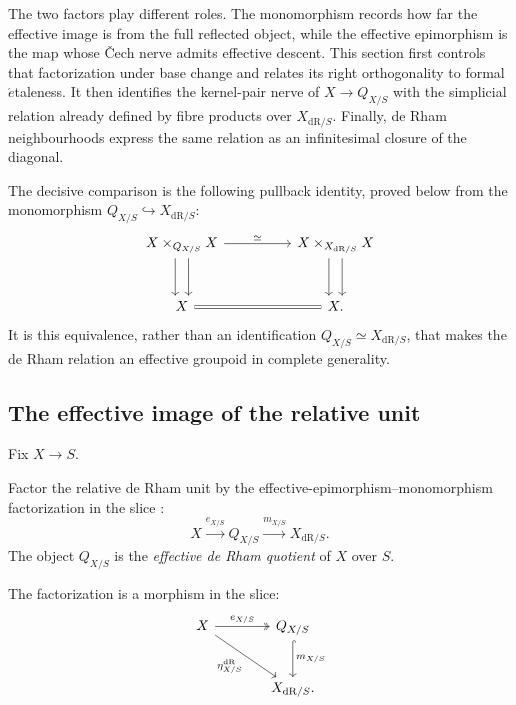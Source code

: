 The two factors play different roles. The monomorphism records how far the
effective image is from the full reflected object, while the effective
epimorphism is the map whose \v{C}ech nerve admits effective descent. This
section first controls that factorization under base change and relates its
right orthogonality to formal \(\acute{e}\)taleness. It then identifies the
kernel-pair nerve of \(X\to Q_{X/S}\) with the simplicial relation already
defined by fibre products over \(X_{\mathrm{dR}/S}\). Finally, de Rham
neighbourhoods express the same relation as an infinitesimal closure of the
diagonal.

The decisive comparison is the following pullback identity, proved below from
the monomorphism \(Q_{X/S}\hookrightarrow X_{\mathrm{dR}/S}\):
\[
\begin{tikzcd}[column sep=huge,row sep=large]
  X\times_{Q_{X/S}}X
      \arrow[r,"\simeq"]
      \arrow[d,shift left=1.1ex]
      \arrow[d,shift right=1.1ex]
  &
  X\times_{X_{\mathrm{dR}/S}}X
      \arrow[d,shift left=1.1ex]
      \arrow[d,shift right=1.1ex]
  \\
  X \arrow[r,equal] & X .
\end{tikzcd}
\]
It is this equivalence, rather than an identification
\(Q_{X/S}\simeq X_{\mathrm{dR}/S}\), that makes the de Rham relation an
effective groupoid in complete generality.
\subsection{The effective image of the relative unit}
\label{sec:effective-de-Rham-quotient}

Fix \(X\to S\).

\begin{definition}
Factor the relative de Rham unit by the effective-epimorphism--monomorphism
factorization in the slice \cite{LurieHigherToposTheory}:
\[
  X\xrightarrow{e_{X/S}}Q_{X/S}
   \xrightarrow{m_{X/S}}X_{\mathrm{dR}/S}.
\]
The object \(Q_{X/S}\) is the \emph{effective de Rham quotient} of \(X\)
over \(S\).

The factorization is a morphism in the slice:
\[
\begin{tikzcd}[column sep=large,row sep=large]
  X
    \arrow[r,two heads,"e_{X/S}"]
    \arrow[dr,"\eta_{X/S}^{\mathrm{dR}}"']
  &
  Q_{X/S}
    \arrow[d,hook,"m_{X/S}"]
  \\
  &
  X_{\mathrm{dR}/S}.
\end{tikzcd}
\]

\end{definition}

